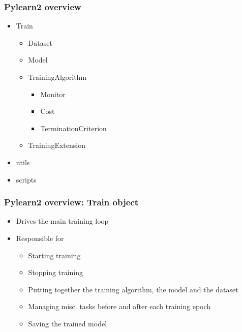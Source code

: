 \documentclass[mathserif, xcolor=dvipsnames]{beamer}
\begin{document}
\begin{frame}
    \frametitle{Pylearn2 overview}

    \begin{itemize}\addtolength{\itemsep}{0.5\baselineskip}
        \item{
            Train
            \begin{itemize}\addtolength{\itemsep}{0.5\baselineskip}
                \item{Dataset}
                \item{Model}
                \item{
                    TrainingAlgorithm
                    \begin{itemize}\addtolength{\itemsep}{0.5\baselineskip}
                        \item{Monitor}
                        \item{Cost}
                        \item{TerminationCriterion}
                    \end{itemize}
                }
                \item{TrainingExtension}
            \end{itemize}
        }
        \item{utils}
        \item{scripts}
    \end{itemize}

\end{frame}

\begin{frame}
    \frametitle{Pylearn2 overview: \textbf{Train} object}

    \begin{itemize}\addtolength{\itemsep}{0.5\baselineskip}
        \item{Drives the main training loop}
        \item{
            Responsible for
            \begin{itemize}
                \item{Starting training}
                \item{Stopping training}
                \item{Putting together the training algorithm, the model and the
                      dataset}
                \item{Managing misc. tasks before and after each training epoch}
                \item{Saving the trained model}
            \end{itemize}
        }
    \end{itemize}

\end{frame}
\end{document}

